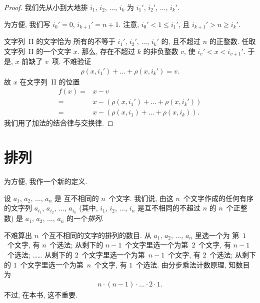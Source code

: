 \documentclass[../libro.tex]{subfiles}
\begin{document}
\begin{proof}
    我们先从小到大地排
    \(i_1\), \(i_2\), \(\dots\), \(i_k\)
    为
    \(i_1'\), \(i_2'\), \(\dots\), \(i_k'\).

    为方便, 我们写
    \(i_0' = 0\),
    \(i_{k+1}' = n + 1\).
    注意, \(i_0' < 1 \leq i_1'\),
    且 \(i_{k+1}' > n \geq i_k'\).

    文字列~II 的文字恰为%
    所有的不等于
    \(i_1'\), \(i_2'\), \(\dots\), \(i_k'\)
    的, 且不超过 \(n\) 的正整数.
    任取文字列~II 的一个文字 \(x\).
    那么, 存在不超过 \(k\) 的非负整数 \(v\),
    使 \(i_v' < x < i_{v+1}'\).
    于是,
    \(x\) 前缺了 \(v\)~项.
    不难验证
    \begin{align*}
        \rho(x, i_1') + \dots + \rho(x, i_k') = v.
    \end{align*}
    故 \(x\) 在文字列~II 的位置
    \begin{align*}
        f(x)
        = {} &
        x - v
        \\
        = {} &
        x - (\rho(x, i_1') + \dots + \rho(x, i_k'))
        \\
        = {} &
        x - (\rho(x, i_1) + \dots + \rho(x, i_k)).
    \end{align*}
    我们用了加法的结合律与交换律.
\end{proof}

\KunAsteriskoEnEnhavtabelo
\section{排列}
\SenAsteriskoEnEnhavtabelo

\maldevigalegajxo

为方便, 我作一个新的定义.

\begin{definition}[排列]
    设 \(a_1\), \(a_2\), \(\dots\), \(a_n\) 是%
    互不相同的 \(n\)~个文字.
    我们说, 由这 \(n\)~个文字作成的任何有序的文字列
    \(a_{i_1}\), \(a_{i_2}\), \(\dots\), \(a_{i_n}\)
    (其中, \(i_1\), \(i_2\), \(\dots\), \(i_n\)
    是互不相同的不超过 \(n\) 的 \(n\)~个正整数)
    是 \(a_1\), \(a_2\), \(\dots\), \(a_n\)
    的一个\emph{排列}.
\end{definition}

不难算出 \(n\)~个互不相同的文字的排列的数目.
从 \(a_1\), \(a_2\), \(\dots\), \(a_n\) 里选一个为%
第~\(1\)~个文字,
有 \(n\)~个选法;
从剩下的 \(n-1\)~个文字里选一个为第~\(2\)~个文字,
有 \(n-1\)~个选法;
……
从剩下的 \(2\)~个文字里选一个为第~\(n-1\)~个文字,
有 \(2\)~个选法;
从剩下的 \(1\)~个文字里选一个为第~\(n\)~个文字,
有 \(1\)~个选法.
由分步乘法计数原理, 知数目为
\begin{align*}
    n \cdot (n - 1) \cdot \dots \cdot 2 \cdot 1.
\end{align*}
不过, 在本书, 这不重要.
\end{document}
